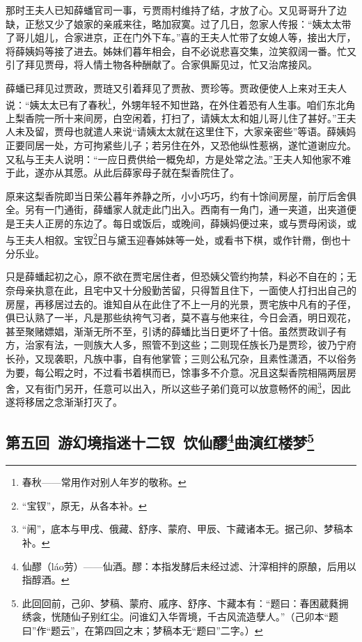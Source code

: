 \par 那时王夫人已知薛蟠官司一事，亏贾雨村维持了结，才放了心。又见哥哥升了边缺，正愁又少了娘家的亲戚来往，略加寂寞。过了几日，忽家人传报：“姨太太带了哥儿姐儿，合家进京，正在门外下车。”喜的王夫人忙带了女媳人等，接出大厅，将薛姨妈等接了进去。姊妹们暮年相会，自不必说悲喜交集，泣笑叙阔一番。忙又引了拜见贾母，将人情土物各种酬献了。合家俱厮见过，忙又治席接风。
\par 薛蟠已拜见过贾政，贾琏又引着拜见了贾赦、贾珍等。贾政便使人上来对王夫人说：“姨太太已有了春秋\footnote{春秋——常用作对别人年岁的敬称。}，外甥年轻不知世路，在外住着恐有人生事。咱们东北角上梨香院一所十来间房，白空闲着，打扫了，请姨太太和姐儿哥儿住了甚好。”王夫人未及留，贾母也就遣人来说“请姨太太就在这里住下，大家亲密些”等语。薛姨妈正要同居一处，方可拘紧些儿子；若另住在外，又恐他纵性惹祸，遂忙道谢应允。又私与王夫人说明：“一应日费供给一概免却，方是处常之法。”王夫人知他家不难于此，遂亦从其愿。从此后薛家母子就在梨香院住了。
\par 原来这梨香院即当日荣公暮年养静之所，小小巧巧，约有十馀间房屋，前厅后舍俱全。另有一门通街，薛蟠家人就走此门出入。西南有一角门，通一夹道，出夹道便是王夫人正房的东边了。每日或饭后，或晚间，薛姨妈便过来，或与贾母闲谈，或与王夫人相叙。宝钗\footnote{“宝钗”，原无，从各本补。}日与黛玉迎春姊妹等一处，或看书下棋，或作针黹，倒也十分乐业。
\par 只是薛蟠起初之心，原不欲在贾宅居住者，但恐姨父管约拘禁，料必不自在的；无奈母亲执意在此，且宅中又十分殷勤苦留，只得暂且住下，一面使人打扫出自己的房屋，再移居过去的。谁知自从在此住了不上一月的光景，贾宅族中凡有的子侄，俱已认熟了一半，凡是那些纨袴气习者，莫不喜与他来往，今日会酒，明日观花，甚至聚赌嫖娼，渐渐无所不至，引诱的薛蟠比当日更坏了十倍。虽然贾政训子有方，治家有法，一则族大人多，照管不到这些；二则现任族长乃是贾珍，彼乃宁府长孙，又现袭职，凡族中事，自有他掌管；三则公私冗杂，且素性潇洒，不以俗务为要，每公暇之时，不过看书着棋而已，馀事多不介意。况且这梨香院相隔两层房舍，又有街门另开，任意可以出入，所以这些子弟们竟可以放意畅怀的闹\footnote{“闹”，底本与甲戌、俄藏、舒序、蒙府、甲辰、卞藏诸本无。据己卯、梦稿本补。}，因此遂将移居之念渐渐打灭了。


\clearpage
\subsection*{第五回\ 游幻境指迷十二钗\ 饮仙醪\footnote{仙醪（láo劳）——仙酒。醪：本指发酵后未经过滤、汁滓相拌的原酿，后用以指醇酒。}曲演红楼梦\footnote{此回回前，己卯、梦稿、蒙府、戚序、舒序、卞藏本有：“题曰：春困葳蕤拥绣衾，恍随仙子别红尘。问谁幻入华胥境，千古风流造孽人。”（己卯本“题曰”作“题云”，在第四回之末；梦稿本无“题曰”二字。）}}


